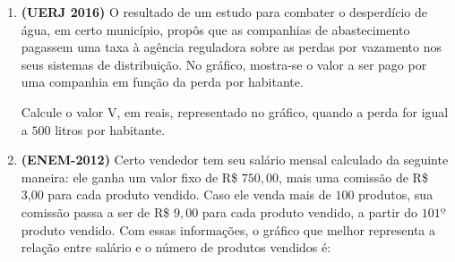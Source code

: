 \begin{enumerate}
\item \textbf{(UERJ 2016)} O resultado de um estudo para combater o desperdício de água, em certo município, propôs que as companhias de abastecimento pagassem uma taxa à agência reguladora sobre as perdas por vazamento nos seus sistemas de distribuição. No gráfico, mostra-se o valor a ser pago por uma companhia em função da perda por habitante.
{
}

Calcule o valor V, em reais, representado no gráfico, quando a perda for igual a \(500\) litros por habitante.


\item \textbf{(ENEM-2012)} Certo vendedor tem seu salário mensal calculado da seguinte maneira: ele ganha um valor fixo de R\$ \(750,00\), mais uma comissão de R\$ 3,00 para cada produto vendido. Caso ele venda mais de \(100\) produtos, sua comissão passa a ser de R\$ \(9,00\) para cada produto vendido, a partir do \(101º\) produto vendido. Com essas informações, o gráfico que melhor representa a relação entre salário e o número de produtos vendidos é:
\begin{enumerate}[left=-1em]
\begin{multicols}{2}


\end{multicols}
\end{enumerate}
\end{enumerate}
